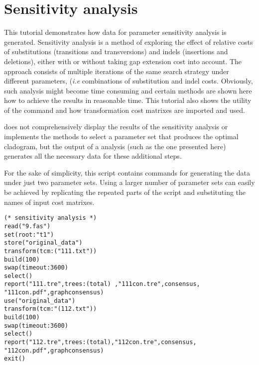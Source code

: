 
\section{Sensitivity analysis}{\label{tutorial7}}

This tutorial demonstrates how data for parameter sensitivity analysis is generated. Sensitivity analysis 
\cite{wheeler1995} is a method of exploring the effect of relative costs of substitutions (transitions and 
transversions) and indels (insertions and deletions), either with or without taking gap extension cost into 
account. The approach consists of multiple iterations of the same search strategy under different parameters, 
(\emph{i.e} combinations of substitution and indel costs. Obviously, such analysis might become time 
consuming and certain methods are shown here how to achieve the results in reasonable time. This tutorial also
 shows the utility of the command  and how transformation cost matrixes are imported and 
 used.

\poy does not comprehensively display the results of the sensitivity analysis or implements the methods to select 
a parameter set that produces the optimal cladogram, but the output of a \poy analysis (such as the one 
presented here) generates all the necessary data for these additional steps.

For the sake of simplicity, this script contains commands for generating the data under just two parameter  sets. 
Using a larger number of parameter sets can easily be achieved by replicating the repeated parts of the script 
and substituting the names of input cost matrixes.

\begin{verbatim}
(* sensitivity analysis *)
read("9.fas")
set(root:"t1")
store("original_data")
transform(tcm:("111.txt"))
build(100)
swap(timeout:3600)
select()
report("111.tre",trees:(total) ,"111con.tre",consensus,
"111con.pdf",graphconsensus)
use("original_data")
transform(tcm:"(112.txt"))
build(100)
swap(timeout:3600)
select()
report("112.tre",trees:(total),"112con.tre",consensus,
"112con.pdf",graphconsensus)
exit()
\end{verbatim}

